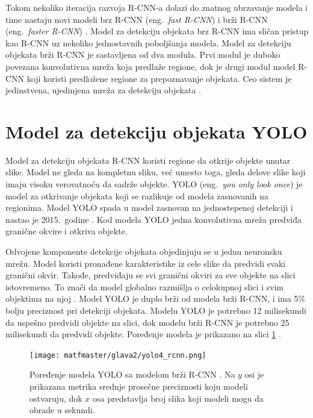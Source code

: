\documentclass[12pt,oneside]{memoir}
\begin{document}
Tokom nekoliko iteracija razvoja R-CNN-a dolazi do znatnog ubrzavanje modela i time nastaju novi modeli brz R-CNN (eng.~\textit{fast R-CNN}) \cite{girshick2015fast} i brži R-CNN (eng.~\textit{faster R-CNN}) \cite{ren2015faster}.  Model za detekciju objekata brz R-CNN ima sličan pristup kao R-CNN uz nekoliko jednostavnih poboljšanja modela. Model za detekciju objekata brži R-CNN  je sastavljena od dva modula. Prvi modul je duboko povezana konvolutivna mreža koja predlaže regione, dok je drugi modul model R-CNN koji koristi predložene regione za prepoznavanje objekata. Ceo sistem je jedinstvena, ujedinjena mreža za detekciju objekata \cite{ren2015faster}.


\section{Model za detekciju objekata YOLO}
Model za detekciju objekata R-CNN koristi regione da otkrije objekte unutar slike. Model ne gleda na kompletnu sliku, već umesto toga, gleda delove slike koji imaju visoku verovatnoću da sadrže objekte. YOLO (eng.~\textit{you only look once}) je model za otkrivanje objekata koji se razlikuje od modela zasnovanih na regionima. Model YOLO spada u model zasnovan na jednostepenoj detekciji i nastao je 2015.~godine \cite{redmon2016you}. Kod modela YOLO jedna konvolutivna mreža predviđa granične okvire i otkriva objekte.

Odvojene komponente detekcije objekata objedinjuju se u jednu neuronsku mrežu. Model koristi pronađene karakteristike iz cele slike da predvidi svaki granični okvir. Takođe, predviđaju se svi granični okviri za sve objekte na slici istovremeno. To znači da model globalno razmišlja o celokupnoj slici i svim objektima na njoj \cite{redmon2016you}. Model YOLO je duplo brži od modela brži R-CNN, i ima 5\% bolju preciznost pri detekciji objekata. Modelu YOLO je potrebno 12 milisekundi da uspešno predvidi objekte na slici, dok modelu brži R-CNN je potrebno 25 milisekundi da predvidi objekte. Poređenje modela je prikazano na slici \ref{fig:section2_YOLOvsRCNN} \cite{bdcc6030072}.

\begin{figure}[ht]
    \centering
    \texttt{[image: matfmaster/glava2/yolo4\_rcnn.png]}
    \caption{ Poređenje modela YOLO sa modelom brži R-CNN \cite{bdcc6030072}. Na $y$ osi je prikazana metrika srednje prosečne preciznosti koju modeli ostvaruju, dok $x$ osa predstavlja broj slika koji modeli mogu da obrade u sekundi.}
    \label{fig:section2_YOLOvsRCNN}
\end{figure}
\end{document}
